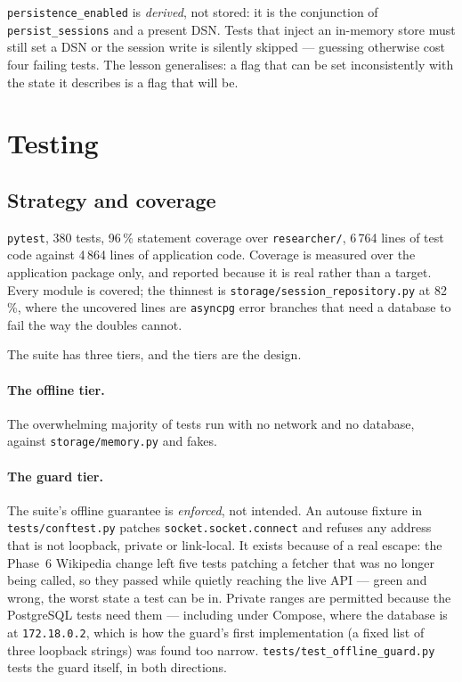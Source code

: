 \documentclass[10pt,a4paper]{article}
\begin{document}
\begin{findingbox}
\texttt{persistence\_enabled} is \emph{derived}, not stored: it is the conjunction of
\texttt{persist\_sessions} and a present DSN. Tests that inject an in-memory store must still set
a DSN or the session write is silently skipped --- guessing otherwise cost four failing tests.
The lesson generalises: a flag that can be set inconsistently with the state it describes is a
flag that will be.
\end{findingbox}

\section{Testing}

\subsection{Strategy and coverage}

\texttt{pytest}, 380 tests, 96\,\% statement coverage over \texttt{researcher/},
6\,764 lines of test code against 4\,864 lines of application code. Coverage is measured over
the application package only, and reported because it is real rather than a target. Every module
is covered; the thinnest is \texttt{storage/session\_repository.py} at 82\,\%, where the uncovered
lines are \texttt{asyncpg} error branches that need a database to fail the way the doubles cannot.

The suite has three tiers, and the tiers are the design.

\paragraph{The offline tier.} The overwhelming majority of tests run with no network and no
database, against \texttt{storage/memory.py} and fakes.

\paragraph{The guard tier.} The suite's offline guarantee is \emph{enforced}, not intended. An
autouse fixture in \texttt{tests/conftest.py} patches \texttt{socket.socket.connect} and refuses
any address that is not loopback, private or link-local. It exists because of a real escape: the
Phase~6 Wikipedia change left five tests patching a fetcher that was no longer being called, so
they passed while quietly reaching the live API --- green and wrong, the worst state a test can
be in. Private ranges are permitted because the PostgreSQL tests need
them --- including under Compose, where the database is at \texttt{172.18.0.2}, which is how the
guard's first implementation (a fixed list of three loopback strings) was found too narrow.
\texttt{tests/test\_offline\_guard.py} tests the guard itself, in both directions.
\end{document}
